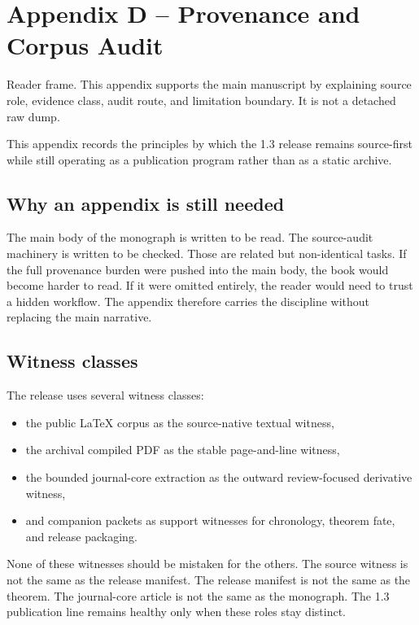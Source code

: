 \section{Appendix D -- Provenance and Corpus Audit}
Reader frame. This appendix supports the main manuscript by explaining source role, evidence class, audit route, and limitation boundary. It is not a detached raw dump.

\label{sec:oc13-source-audit-appendix}

This appendix records the principles by which the 1.3 release remains source-first while still
operating as a publication program rather than as a static archive.

\subsection{Why an appendix is still needed}

The main body of the monograph is written to be read.
The source-audit machinery is written to be checked.
Those are related but non-identical tasks.
If the full provenance burden were pushed into the main body, the book would become harder to read.
If it were omitted entirely, the reader would need to trust a hidden workflow.
The appendix therefore carries the discipline without replacing the main narrative.

\subsection{Witness classes}

The release uses several witness classes:

\begin{itemize}
\item the public LaTeX corpus as the source-native textual witness,
\item the archival compiled PDF as the stable page-and-line witness,
\item the bounded journal-core extraction as the outward review-focused derivative witness,
\item and companion packets as support witnesses for chronology, theorem fate, and release
      packaging.
\end{itemize}

None of these witnesses should be mistaken for the others.
The source witness is not the same as the release manifest.
The release manifest is not the same as the theorem.
The journal-core article is not the same as the monograph.
The 1.3 publication line remains healthy only when these roles stay distinct.


